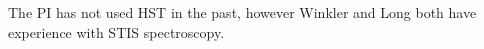 \documentclass[12pt]{article}
\begin{document}


%
%
%
\pasthstusage  %
The PI has not used HST in the past, however Winkler and Long both have experience with STIS spectroscopy.

\newpage


\end{document}
